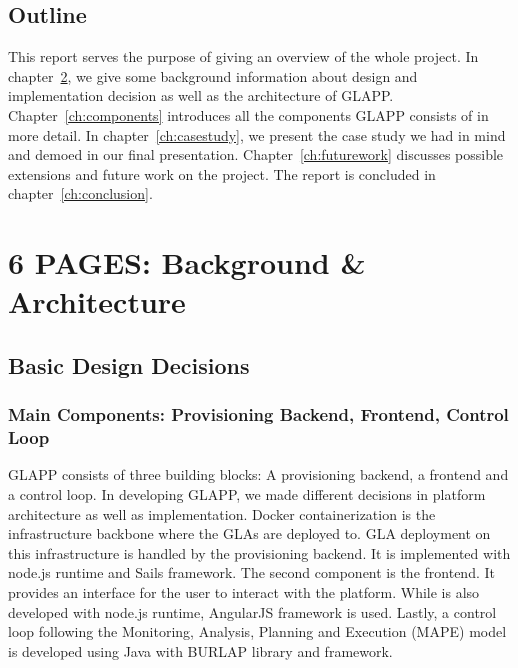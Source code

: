 \documentclass{seal_thesis}
\begin{document}
\section{Outline}
This report serves the purpose of giving an overview of the whole project.
In chapter~\ref{ch:background}, we give some background information about design and implementation decision as well as the architecture of GLAPP.
Chapter~\ref{ch:components} introduces all the components GLAPP consists of in more detail.
In chapter~\ref{ch:casestudy}, we present the case study we had in mind and demoed in our final presentation.
Chapter~\ref{ch:futurework} discusses possible extensions and future work on the project.
The report is concluded in chapter~\ref{ch:conclusion}.



\chapter{6 PAGES: Background \& Architecture}\label{ch:background}

\section{Basic Design Decisions}

\subsection{Main Components: Provisioning Backend, Frontend, Control Loop}
GLAPP consists of three building blocks: A provisioning backend, a frontend and a control loop.
In developing GLAPP, we made different decisions in platform architecture as well as implementation.
Docker containerization is the infrastructure backbone where the GLAs are deployed to.
GLA deployment on this infrastructure is handled by the provisioning backend.
It is implemented with node.js runtime and Sails framework.
The second component is the frontend.
It provides an interface for the user to interact with the platform.
While is also developed with node.js runtime, AngularJS framework is used.
Lastly, a control loop following the Monitoring, Analysis, Planning and Execution (MAPE) model is developed using Java with BURLAP library and framework.
\end{document}
